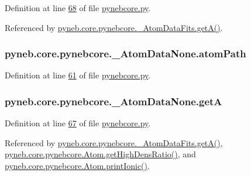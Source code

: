 Definition at line \hyperlink{pynebcore_8py_source_l00068}{68} of file \hyperlink{pynebcore_8py_source}{pynebcore.\-py}.



Referenced by \hyperlink{pynebcore_8py_source_l00212}{pyneb.\-core.\-pynebcore.\-\_\-\-Atom\-Data\-Fits.\-get\-A()}.

\hypertarget{classpyneb_1_1core_1_1pynebcore_1_1___atom_data_none_aa255a7f490aa5d1cf7cfee7c5eb388ae}{
\subsubsection[{atom\-Path}]{\setlength{\rightskip}{0pt plus 5cm}pyneb.\-core.\-pynebcore.\-\_\-\-Atom\-Data\-None.\-atom\-Path}}\label{classpyneb_1_1core_1_1pynebcore_1_1___atom_data_none_aa255a7f490aa5d1cf7cfee7c5eb388ae}


Definition at line \hyperlink{pynebcore_8py_source_l00061}{61} of file \hyperlink{pynebcore_8py_source}{pynebcore.\-py}.

\hypertarget{classpyneb_1_1core_1_1pynebcore_1_1___atom_data_none_a44aa15dc5314c07627944e86581631b1}{
\subsubsection[{get\-A}]{\setlength{\rightskip}{0pt plus 5cm}pyneb.\-core.\-pynebcore.\-\_\-\-Atom\-Data\-None.\-get\-A}}\label{classpyneb_1_1core_1_1pynebcore_1_1___atom_data_none_a44aa15dc5314c07627944e86581631b1}


Definition at line \hyperlink{pynebcore_8py_source_l00067}{67} of file \hyperlink{pynebcore_8py_source}{pynebcore.\-py}.



Referenced by \hyperlink{pynebcore_8py_source_l00212}{pyneb.\-core.\-pynebcore.\-\_\-\-Atom\-Data\-Fits.\-get\-A()}, \hyperlink{pynebcore_8py_source_l01719}{pyneb.\-core.\-pynebcore.\-Atom.\-get\-High\-Dens\-Ratio()}, and \hyperlink{pynebcore_8py_source_l02233}{pyneb.\-core.\-pynebcore.\-Atom.\-print\-Ionic()}.

